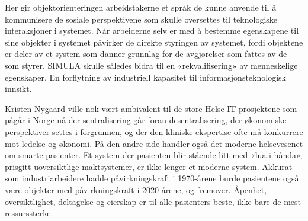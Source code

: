 \documentclass[../main.tex]{subfiles}
\begin{document}
Her gir objektorienteringen arbeidstakerne et språk de kunne anvende til å kommunisere de sosiale perspektivene som skulle oversettes til teknologiske interaksjoner i systemet. Når arbeiderne selv er med å bestemme egenskapene til sine objekter i systemet påvirker de direkte styringen av systemet, fordi objektene er deler av et system som danner grunnlag for de avgjørelser som fattes av de som styrer. SIMULA skulle således bidra til en «rekvalifisering» av menneskelige egenskaper. En forflytning av industriell kapasitet til informasjonsteknologisk innsikt. 

Kristen Nygaard ville nok vært ambivalent til de store Helse-IT prosjektene som pågår i Norge nå der sentralisering går foran desentralisering, der økonomiske perspektiver settes i forgrunnen, og der den kliniske ekspertise ofte må konkurrere mot ledelse og økonomi. På den andre side handler også det moderne helsevesenet om smarte pasienter. Et system der pasienten blir stående litt med «lua i hånda», prisgitt uoversiktlige maktsystemer, er ikke lenger et moderne system. Akkurat som industriarbeidere hadde påvirkningskraft i 1970-årene burde pasientene også være objekter med påvirkningskraft i 2020-årene, og fremover. Åpenhet, oversiktlighet, deltagelse og eierskap er til alle pasienters beste, ikke bare de mest ressurssterke.
\end{document}
